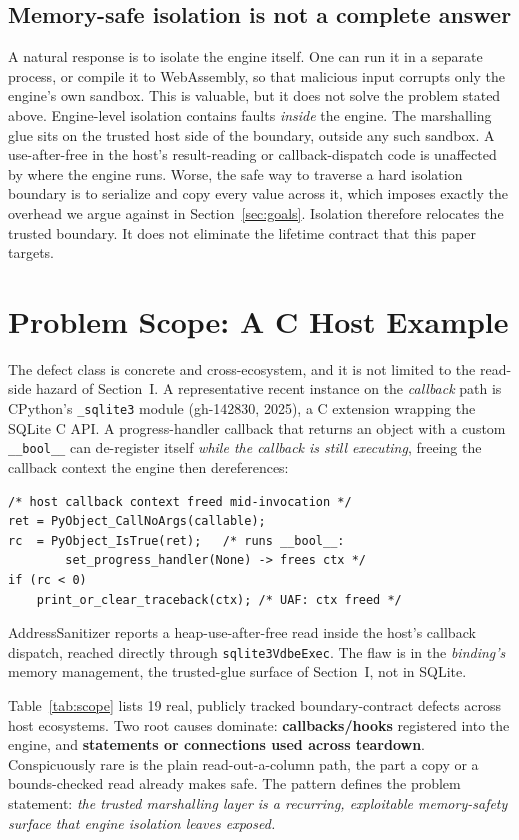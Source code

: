 \documentclass[10pt,twocolumn]{article}
\begin{document}
\subsection{Memory-safe isolation is not a complete answer}
A natural response is to isolate the engine itself. One can run it in a
separate process, or compile it to WebAssembly, so that malicious input
corrupts only the engine's own sandbox. This is valuable, but it does not
solve the problem stated above. Engine-level isolation contains faults
\emph{inside} the engine. The marshalling glue sits on the trusted host side
of the boundary, outside any such sandbox. A use-after-free in the host's
result-reading or callback-dispatch code is unaffected by where the engine
runs. Worse, the safe way to traverse a hard isolation boundary is to serialize
and copy every value across it, which imposes exactly the overhead we argue
against in Section~\ref{sec:goals}. Isolation therefore relocates the trusted
boundary. It does not eliminate the lifetime contract that this paper targets.

\section{Problem Scope: A C Host Example}
\label{sec:scope}

The defect class is concrete and cross-ecosystem, and it is not limited to the
read-side hazard of Section~I. A representative recent instance on the
\emph{callback} path is CPython's \texttt{\_sqlite3} module (gh-142830, 2025), a
C extension wrapping the SQLite C API. A progress-handler callback that returns
an object with a custom \texttt{\_\_bool\_\_} can de-register itself
\emph{while the callback is still executing}, freeing the callback context the
engine then dereferences:

\begin{lstlisting}
/* host callback context freed mid-invocation */
ret = PyObject_CallNoArgs(callable);
rc  = PyObject_IsTrue(ret);   /* runs __bool__:
        set_progress_handler(None) -> frees ctx */
if (rc < 0)
    print_or_clear_traceback(ctx); /* UAF: ctx freed */
\end{lstlisting}

\noindent AddressSanitizer reports a heap-use-after-free read inside the host's
callback dispatch, reached directly through \texttt{sqlite3VdbeExec}. The flaw
is in the \emph{binding's} memory management, the trusted-glue surface of
Section~I, not in SQLite.

Table~\ref{tab:scope} lists 19 real, publicly tracked boundary-contract defects
across host ecosystems. Two root causes dominate: \textbf{callbacks/hooks}
registered into the engine, and \textbf{statements or connections used across
teardown}. Conspicuously rare is the plain read-out-a-column path, the part a
copy or a bounds-checked read already makes safe. The pattern defines the
problem statement: \emph{the trusted marshalling layer is a recurring,
exploitable memory-safety surface that engine isolation leaves exposed.}
\end{document}
